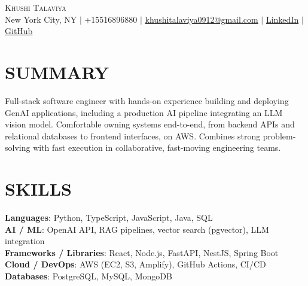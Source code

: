 \documentclass[letterpaper,11pt]{article}
\begin{document}
\begin{center}
    {\Huge \scshape Khushi Talaviya} \\ \vspace{2pt}
    \vspace{4pt}
    \small
    New York City, NY $|$
    \small
    +15516896880 $|$
    \href{mailto:khushitalaviya0912@gmail.com}{khushitalaviya0912@gmail.com} $|$
    \href{https://www.linkedin.com/in/khushitalaviya/}{LinkedIn} $|$
    \href{https://github.com/talaviyakhushi}{GitHub}
\end{center}

\section{SUMMARY}
\vspace{5pt}
\small{Full-stack software engineer with hands-on experience building and deploying GenAI applications, including a production AI pipeline integrating an LLM vision model. Comfortable owning systems end-to-end, from backend APIs and relational databases to frontend interfaces, on AWS. Combines strong problem-solving with fast execution in collaborative, fast-moving engineering teams.}

\vspace{2pt}
\section{SKILLS}
\vspace{5pt}
\begin{itemize}[leftmargin=0in, label={}]
\small{\item{
\textbf{Languages}{: Python, TypeScript, JavaScript, Java, SQL} \\
\textbf{AI / ML}{: OpenAI API, RAG pipelines, vector search (pgvector), LLM integration} \\
\textbf{Frameworks / Libraries}{: React, Node.js, FastAPI, NestJS, Spring Boot} \\
\textbf{Cloud / DevOps}{: AWS (EC2, S3, Amplify), GitHub Actions, CI/CD} \\
\textbf{Databases}{: PostgreSQL, MySQL, MongoDB}
}}
\end{itemize}
\vspace{-10pt}

\end{document}
